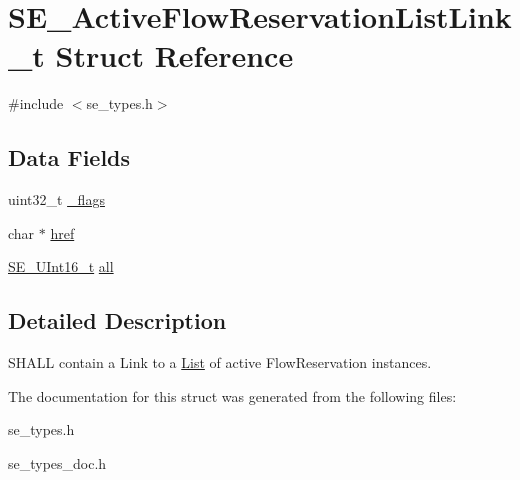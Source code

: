\hypertarget{structSE__ActiveFlowReservationListLink__t}{}\section{S\+E\+\_\+\+Active\+Flow\+Reservation\+List\+Link\+\_\+t Struct Reference}
\label{structSE__ActiveFlowReservationListLink__t}


{\ttfamily \#include $<$se\+\_\+types.\+h$>$}

\subsection*{Data Fields}
\begin{DoxyCompactItemize}
\item 
uint32\+\_\+t \hyperlink{group__ActiveFlowReservationListLink_gab04404a94a50dffbb0d4c65ca0b01082}{\+\_\+flags}
\item 
char $\ast$ \hyperlink{group__ActiveFlowReservationListLink_ga6b547f1f9bca676a3c9115adbaf2366f}{href}
\item 
\hyperlink{group__UInt16_gac68d541f189538bfd30cfaa712d20d29}{S\+E\+\_\+\+U\+Int16\+\_\+t} \hyperlink{group__ActiveFlowReservationListLink_gadf239f5f9855c67204029ef9589feced}{all}
\end{DoxyCompactItemize}


\subsection{Detailed Description}
S\+H\+A\+LL contain a Link to a \hyperlink{structList}{List} of active Flow\+Reservation instances. 

The documentation for this struct was generated from the following files\+:\begin{DoxyCompactItemize}
\item 
se\+\_\+types.\+h\item 
se\+\_\+types\+\_\+doc.\+h\end{DoxyCompactItemize}
